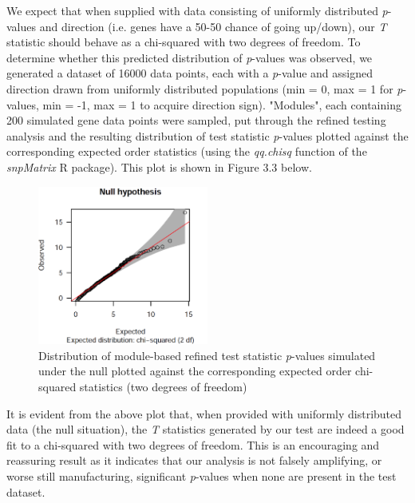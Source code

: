 
We expect that when supplied with data consisting of uniformly distributed \textit{p}-values and direction (i.e. genes have a 50-50 chance of going up/down), our \textit{T} statistic should behave as a chi-squared with two degrees of freedom. To determine whether this predicted distribution of \textit{p}-values was observed, we generated a dataset of 16000 data points, each with a \textit{p}-value and assigned direction drawn from uniformly distributed populations (min = 0, max = 1 for \textit{p}-values, min = -1, max = 1 to acquire direction sign). "Modules", each containing 200 simulated gene data points were sampled, put through the refined testing analysis and the resulting distribution of test statistic \textit{p}-values plotted against the corresponding expected order statistics (using the \textit{qq.chisq} function of the \textit{snpMatrix} R package). This plot is shown in Figure 3.3 below. 

\begin{figure}[H] 
    \centering
\includegraphics[width=0.5\textwidth]{Figures/Chapter3/simulated_null_skewedDir.png}
\caption{\small{Distribution of module-based refined test statistic \textit{p}-values simulated under the null plotted against the corresponding expected order chi-squared statistics (two degrees of freedom)} }
    \label{fig:9}
\end{figure}

It is evident from the above plot that, when provided with uniformly distributed data (the null situation), the \textit{T} statistics generated by our test are indeed a good fit to a chi-squared with two degrees of freedom. This is an encouraging and reassuring result as it indicates that our analysis is not falsely amplifying, or worse still manufacturing, significant \textit{p}-values when none are present in the test dataset. 

